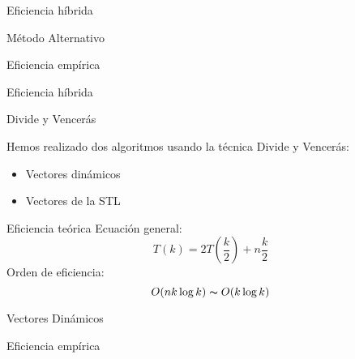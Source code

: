 \documentclass[spanish]{beamer}
\begin{document}
\begin{frame}{Eficiencia híbrida}
  \fontsize{8pt}{7.2}\selectfont
	\begin{center}
	\resizebox*{11cm}{!}{
		
	}
	\end{center}
\end{frame}

\begin{frame}{Método Alternativo}
	
\end{frame}

\begin{frame}{Eficiencia empírica}
	\begin{center}
		\resizebox*{11cm}{!}{
			}
	\end{center}
\end{frame}

\begin{frame}{Eficiencia híbrida}
  \fontsize{8pt}{7.2}\selectfont
	\begin{center}
	\resizebox*{11cm}{!}{
		
	}
	\end{center}
\end{frame}

\begin{frame}{Divide y Vencerás}

	Hemos realizado dos algoritmos usando la técnica Divide y Vencerás:
	\begin{itemize}
		\item Vectores dinámicos
		\item Vectores de la STL
	\end{itemize}
\end{frame}

\begin{frame}{Eficiencia teórica}
	Ecuación general: $$ T(k) = 2T\left(\frac{k}{2}\right) + n\frac{k}{2} $$
	Orden de eficiencia: $$ O(nk\log k) \thicksim O(k\log k) $$
\end{frame}

\begin{frame}{Vectores Dinámicos}

	
\end{frame}

\begin{frame}{Eficiencia empírica}

	\begin{center}
	\resizebox*{11cm}{!}{
		
	}
	\end{center}
\end{frame}
\end{document}
